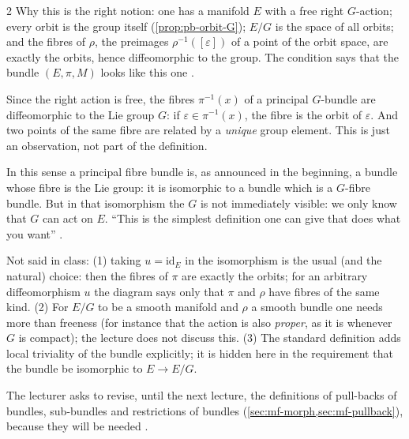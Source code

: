 \begin{paracol}{2}
Why this is the right notion: one has a manifold $E$ with a free right $G$-action; every orbit is the group itself (\cref{prop:pb-orbit-G}); $E/G$ is the space of all orbits; and the fibres of $\rho$, the preimages $\rho^{-1}([\varepsilon])$ of a point of the orbit space, are exactly the orbits, hence diffeomorphic to the group. The condition says that the bundle $(E,\pi,M)$ looks like this one    .
\begin{remark}\label{rem:pb-fibres}
Since the right action is free, the fibres $\pi^{-1}(x)$ of a principal $G$-bundle are diffeomorphic to the Lie group $G$: if $\varepsilon\in\pi^{-1}(x)$, the fibre is the orbit of $\varepsilon$. And two points of the same fibre are related by a \emph{unique} group element. This is just an observation, not part of the definition.   
\end{remark}
In this sense a principal fibre bundle is, as announced in the beginning, a bundle whose fibre is the Lie group: it is isomorphic to a bundle which is a $G$-fibre bundle. But in that isomorphism the $G$ is not immediately visible: we only know that $G$ can act on $E$. ``This is the simplest definition one can give that does what you want''  .
\begin{coursenote}
Not said in class: (1) taking $u=\mathrm{id}_E$ in the isomorphism is the usual (and the natural) choice: then the fibres of $\pi$ are exactly the orbits; for an arbitrary diffeomorphism $u$ the diagram says only that $\pi$ and $\rho$ have fibres of the same kind. (2) For $E/G$ to be a smooth manifold and $\rho$ a smooth bundle one needs more than freeness (for instance that the action is also \emph{proper}, as it is whenever $G$ is compact); the lecture does not discuss this. (3) The standard definition adds local triviality of the bundle explicitly; it is hidden here in the requirement that the bundle be isomorphic to $E\to E/G$. 
\end{coursenote}
The lecturer asks to revise, until the next lecture, the definitions of pull-backs of bundles, sub-bundles and restrictions of bundles (\cref{sec:mf-morph,sec:mf-pullback}), because they will be needed  .


\end{paracol}
